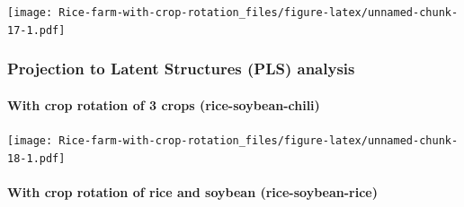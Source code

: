 \documentclass[
]{article}
\newenvironment{Shaded}{\begin{snugshade}}{\end{snugshade}}
\newcommand{\AttributeTok}[1]{\textcolor[rgb]{0.13,0.29,0.53}{#1}}
\newcommand{\DecValTok}[1]{\textcolor[rgb]{0.00,0.00,0.81}{#1}}
\newcommand{\FunctionTok}[1]{\textcolor[rgb]{0.13,0.29,0.53}{\textbf{#1}}}
\newcommand{\NormalTok}[1]{#1}
\newcommand{\OtherTok}[1]{\textcolor[rgb]{0.56,0.35,0.01}{#1}}
\newcommand{\SpecialCharTok}[1]{\textcolor[rgb]{0.81,0.36,0.00}{\textbf{#1}}}
\begin{document}
\texttt{[image: Rice-farm-with-crop-rotation\_files/figure-latex/unnamed-chunk-17-1.pdf]}

\hypertarget{projection-to-latent-structures-pls-analysis}{%
\subsubsection{Projection to Latent Structures (PLS)
analysis}\label{projection-to-latent-structures-pls-analysis}}

\hypertarget{with-crop-rotation-of-3-crops-rice-soybean-chili-1}{%
\paragraph{With crop rotation of 3 crops
(rice-soybean-chili)}\label{with-crop-rotation-of-3-crops-rice-soybean-chili-1}}

\begin{Shaded}
\end{Shaded}

\texttt{[image: Rice-farm-with-crop-rotation\_files/figure-latex/unnamed-chunk-18-1.pdf]}

\hypertarget{with-crop-rotation-of-rice-and-soybean-rice-soybean-rice-1}{%
\paragraph{With crop rotation of rice and soybean
(rice-soybean-rice)}\label{with-crop-rotation-of-rice-and-soybean-rice-soybean-rice-1}}

\begin{Shaded}
\end{Shaded}
\end{document}
